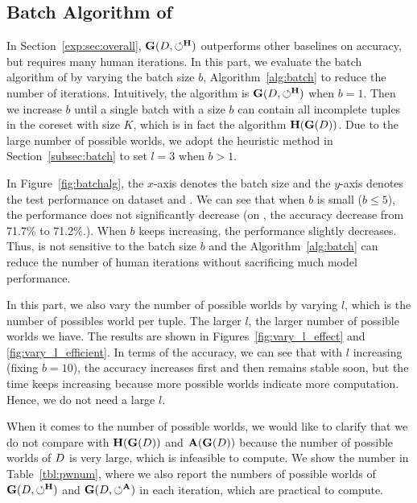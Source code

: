 
\subsection{Batch Algorithm of \ours}
\label{exp:sec:batchalgo}

In Section~\ref{exp:sec:overall}, $\mathbf{G}(D,\circlearrowleft^\mathbf{H})$ outperforms other baselines on accuracy, but requires many human iterations. In this part, we evaluate  the batch algorithm of \ours by varying the batch size $b$, \ie Algorithm~\ref{alg:batch} to reduce the number of iterations. Intuitively, the algorithm is  $\mathbf{G}(D,\circlearrowleft^\mathbf{H})$  when $b=1$. 
Then we increase $b$ until a single batch with a size $b$ can contain all incomplete tuples in the coreset with size $K$, which is in fact the algorithm $\mathbf{H}(\mathbf{G}(D))$.
 Due to the large number of possible worlds, we adopt the heuristic method in Section~\ref{subsec:batch} to set $l=3$ when $b>1$. 

In Figure~\ref{fig:batchalg}, the $x$-axis denotes the batch size and the $y$-axis denotes the test performance on dataset \adult and  \bike. We can see that when $b$ is small (\ie $b \le 5$), the performance does not significantly decrease (\eg on \adult, the accuracy decrease from 71.7\% to 71.2\%.).  When $b$ keeps increasing, the performance slightly decreases. Thus, \ours is not  sensitive to the batch size $b$ and the Algorithm~\ref{alg:batch} can reduce the number of human iterations without sacrificing much  model performance.


In this part, we also vary the number of possible worlds by varying $l$, which is the number of possibles world per tuple. The larger $l$, the larger number of possible worlds we have. The results are shown in Figures~\ref{fig:vary_l_effect} and  \ref{fig:vary_l_efficient}. In terms of the accuracy, we can see that with $l$ increasing (fixing $b=10$), the accuracy increases first and then  remains stable soon, but the time keeps increasing because more possible worlds indicate more computation. Hence, we do not need a large $l$.

When it comes to the number of possible worlds, we would like to clarify that we do not compare with $\mathbf{H}(\mathbf{G}(D))$ and $\mathbf{A}(\mathbf{G}(D))$ because  the number of  possible worlds of $D$ is very large, which is infeasible to compute. We show the number in Table~\ref{tbl:pwnum}, where we also report the numbers of possible worlds of $\mathbf{G}(D,\circlearrowleft^\mathbf{H})$ and $\mathbf{G}(D,\circlearrowleft^\mathbf{A})$ in each iteration, which are practical to compute.

